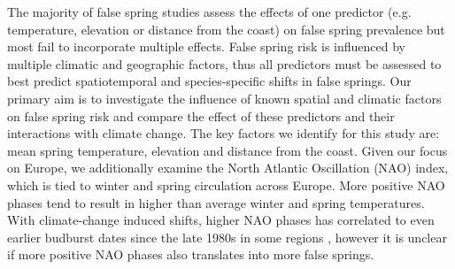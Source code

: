 \documentclass{article}\usepackage[]{graphicx}\usepackage[]{color}
\begin{document}
The majority of false spring studies assess the effects of one predictor (e.g. temperature, elevation or distance from the coast) on false spring prevalence but most fail to incorporate multiple effects. False spring risk is influenced by multiple climatic and geographic factors, thus all predictors must be assessed to best predict spatiotemporal and species-specific shifts in false springs. Our primary aim is to investigate the influence of known spatial and climatic factors on false spring risk and compare the effect of these predictors and their interactions with climate change. The key factors we identify for this study are: mean spring temperature, elevation and distance from the coast. Given our focus on Europe, we additionally examine the North Atlantic Oscillation (NAO) index, which is tied to winter and spring circulation across Europe. More positive NAO phases tend to result in higher than average winter and spring temperatures. With climate-change induced shifts, higher NAO phases has correlated to even earlier budburst dates since the late 1980s in some regions \citep{Chmielewski2001}, however it is unclear if more positive NAO phases also translates into more false springs.
\end{document}
